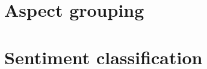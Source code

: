 \documentclass[a4paper,11pt]{kth-mag}
\begin{document}
\section{Aspect grouping}

\section{Sentiment classification}


%
%
%
%
%
%




\end{document}
